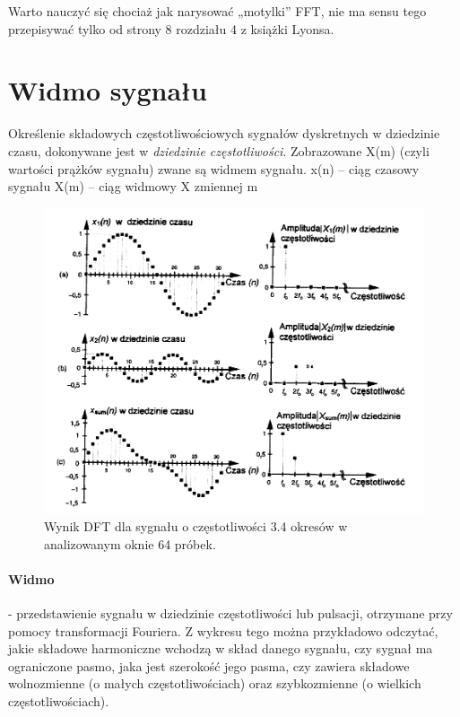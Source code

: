 \documentclass[a4paper,twoside]{report}
\begin{document}
Warto nauczyć się chociaż jak narysować „motylki” FFT, nie ma sensu tego przepisywać tylko od strony 8 rozdziału 4 z książki Lyonsa.

\newpage
\section{Widmo sygnału}
Określenie składowych częstotliwościowych sygnałów dyskretnych w dziedzinie czasu, dokonywane jest w \textit{ dziedzinie częstotliwości}. Zobrazowane X(m) (czyli wartości prążków sygnału) zwane są widmem sygnału.
x(n) – ciąg czasowy sygnału
X(m) – ciąg widmowy X zmiennej m

\begin{figure}[htbp]
	\centering
	\includegraphics[scale=0.7]{obrazy/fourier/widmo.png}
	\caption{Wynik DFT dla sygnału o częstotliwości 3.4 okresów w analizowanym oknie 64 próbek. }
\end{figure}

\paragraph{Widmo} - przedstawienie sygnału w dziedzinie częstotliwości lub pulsacji, otrzymane przy pomocy transformacji Fouriera.
Z wykresu tego można przykładowo odczytać, jakie składowe harmoniczne wchodzą w skład danego sygnału, czy sygnał ma ograniczone pasmo, jaka jest szerokość jego pasma, czy zawiera składowe wolnozmienne (o małych częstotliwościach) oraz szybkozmienne (o wielkich częstotliwościach). 
\end{document}
